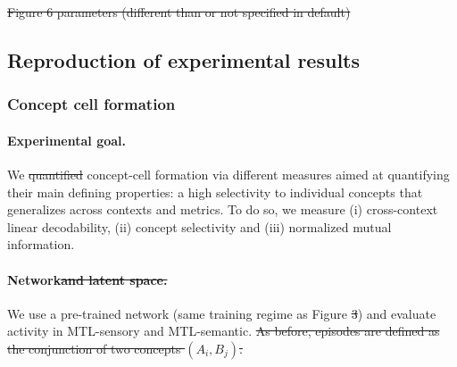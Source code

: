 \documentclass{article}
\providecommand{\DIFaddtex}[1]{{\protect\color{blue}\uwave{#1}}} %
\providecommand{\DIFdeltex}[1]{{\protect\color{red}\sout{#1}}}                      %
\providecommand{\DIFaddbegin}{} %
\providecommand{\DIFaddend}{} %
\providecommand{\DIFdelbegin}{} %
\providecommand{\DIFdelend}{} %
\providecommand{\DIFdelFL}[1]{\DIFdel{#1}} %
\providecommand{\DIFadd}[1]{\texorpdfstring{\DIFaddtex{#1}}{#1}} %
\providecommand{\DIFdel}[1]{\texorpdfstring{\DIFdeltex{#1}}{}} %
\begin{document}
{%
\DIFdelFL{Figure 6 parameters (different than or not specified in default)}}

\DIFdelend \subsection*{Reproduction of experimental results}
\subsubsection*{Concept cell formation }
\paragraph{Experimental goal.}
We \DIFdelbegin \DIFdel{quantified }\DIFdelend \DIFaddbegin \DIFadd{tested }\DIFaddend concept-cell formation via different measures aimed at quantifying their main defining properties: a high selectivity to individual concepts that generalizes across contexts and metrics. To do so, we measure (i) cross-context linear decodability, (ii) concept selectivity and (iii) normalized mutual information.

\paragraph{Network\DIFdelbegin \DIFdel{and latent space.}\DIFdelend }
We use a pre-trained network (same training regime as Figure \DIFdelbegin \DIFdel{3}\DIFdelend \DIFaddbegin \DIFadd{\ref{fig:phase_b}}\DIFaddend ) and evaluate activity in MTL-sensory and MTL-semantic.
\DIFdelbegin \DIFdel{As before, episodes are defined as the conjunction of two concepts $(A_i, B_j)$.
}\DIFdelend 
\end{document}
